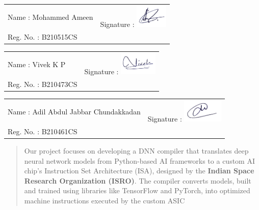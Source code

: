 \documentclass[12pt]{report}
\begin{document}
\begin{spacing}{1.01}
\begin{minipage}{\textwidth}
        \noindent
        \begin{tabular}{p{8cm}p{6cm}}
            Name : Mohammed Ameen & Signature :
            \includegraphics[height=1.12cm]{ameen-signature.png}  \\
            Reg. No. : B210515CS  &             \\
        \end{tabular}
    
        \vspace{0.8cm}
    
        \noindent
        \begin{tabular}{p{8cm}p{6cm}}
            Name : Vivek K P     & Signature :
            \includegraphics[height=1.12cm]{vivek-signature.png}  \\
            Reg. No. : B210473CS &             \\
        \end{tabular}
    
        \vspace{0.8cm}
    
        \noindent
        \begin{tabular}{p{8cm}p{6cm}}
            Name : Adil Abdul Jabbar Chundakkadan & Signature :
            \includegraphics[height=1.12cm]{adil-signature.png}  \\
            Reg. No. : B210461CS                  &             \\
        \end{tabular}
    \end{minipage}
    

    \clearpage


    \begin{abstract}
        Our project focuses on developing a DNN compiler that translates deep neural network models from Python-based AI frameworks to a custom AI chip’s Instruction Set Architecture (ISA), designed by the \textbf{Indian Space Research Organization (ISRO)}. The compiler converts models, built and trained using libraries like TensorFlow and PyTorch, into optimized machine instructions executed by the custom ASIC


\end{abstract}
\end{spacing}
\end{document}
